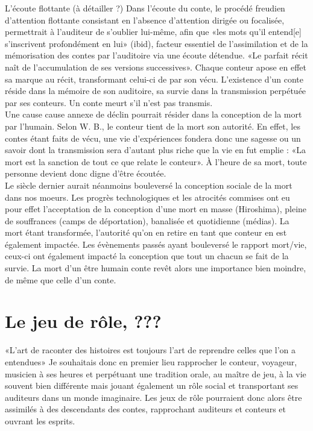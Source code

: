 \documentclass[a4paper,12pt,final,oneside]{article}
\begin{document}
L'écoute flottante (à détailler ?)
Dans l'écoute du conte, le procédé freudien d'attention flottante consistant en l'absence d'attention dirigée ou focalisée, permettrait à l'auditeur de s'oublier lui-même, afin que «les mots qu'il entend[e] s'inscrivent profondément en lui» (ibid), facteur essentiel de l'assimilation et de la mémorisation des contes par l'auditoire via une écoute détendue.
«Le parfait récit naît de l'accumulation de ses versions successives». Chaque conteur apose en effet sa marque au récit, transformant celui-ci de par son vécu.
L'existence d'un conte réside dans la mémoire de son auditoire, sa survie dans la transmission perpétuée par ses conteurs. Un conte meurt s'il n'est pas transmis.\\


Une cause cause annexe de déclin pourrait résider dans la conception de la mort par l'humain.
Selon W. B., le conteur tient de la mort son autorité. En effet, les contes étant faits de vécu, une vie d'expériences fondera donc une sagesse ou un savoir dont la transmission sera d'autant plus riche que la vie en fut emplie :  «La mort est la sanction de tout ce que relate le conteur». À l'heure de sa mort, toute personne devient donc digne d'être écoutée.\\

Le siècle dernier aurait néanmoins bouleversé la conception sociale de la mort dans nos moeurs. Les progrès technologiques et les atrocités commises ont eu pour effet l'acceptation de la conception d'une mort en masse (Hiroshima), pleine de souffrances (camps de déportation), banalisée et quotidienne (médias).
La mort étant transformée, l'autorité qu'on en retire en tant que conteur en est également impactée.
Les évènements passés ayant bouleversé le rapport mort/vie, ceux-ci ont également impacté la conception que tout un chacun se fait de la survie. La mort d'un être humain conte revêt alors une importance bien moindre, de même que celle d'un conte.
\clearpage


\section{Le jeu de rôle, ???}
\cite{cristofari2010lecteur}
\cite{caira2007jeux}
«L'art de raconter des histoires est toujours l'art de reprendre celles que l'on a entendues»
Je souhaitais donc en premier lieu rapprocher le conteur, voyageur, musicien à ses heures et perpétuant une tradition orale, au maître de jeu, à la vie souvent bien différente mais 
jouant également un rôle social et transportant ses auditeurs dans un monde imaginaire.
Les jeux de rôle pourraient donc alors être assimilés à des descendants des contes, rapprochant auditeurs et conteurs et ouvrant les esprits.\\
\end{document}
